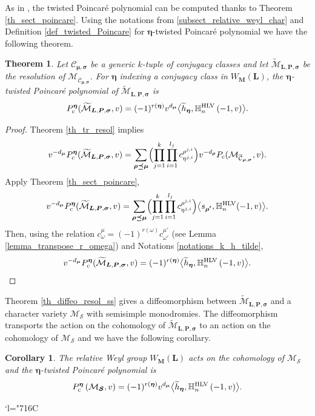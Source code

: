 \documentclass[JEP,XML,SOM,NoEqCountersInSection,Unicode,published]{cedram}
\newcommand{\Changelback}{\mathcode`l="716C}
\newcommand{\rc}{\mathrm{c}}
\newcommand{\HLV}{\textup{HLV}}
\newcommand{\blangle}{\bigl\langle}
\newcommand{\brangle}{\bigr\rangle}
\theoremstyle{definition}
\theoremstyle{plain}
\newtheorem{theorem}[definition]{Theorem}
\newtheorem{corollary}[definition]{Corollary}
\newcommand{\mcmus}{\mathcal{M}_{\overline{\mathcal{C}}_{\boldsymbol{\mu},\boldsymbol{\sigma}}}}
\newcommand{\mcmur}{\mathcal{M}_{\overline{\mathcal{C}}_{\boldsymbol{\rho},\boldsymbol{\sigma}}}}
\newcommand{\mlps}{\widetilde{\mathcal{M}}_{\boldsymbol{L},\boldsymbol{P},\boldsymbol{\sigma}}}
\begin{document}
As in \cite[Prop.\,1.9]{Letellier13}, the twisted Poincaré polynomial can be computed thanks to Theorem \ref{th_sect_poincare}. Using the notations from \ref{subsect_relative_weyl_char} and Definition \ref{def_twisted_Poincare} for $\boldsymbol{\eta}$-twisted Poincaré polynomial we have the following theorem.
\begin{theorem}\label{cor_twiste_Poincare_resol}
Let $\mathcal{C}_{\boldsymbol{\mu},\boldsymbol{\sigma}}$ be a generic $k$-tuple of conjugacy classes and let $\mlps$ be the resolution of $\mcmus$. For $\boldsymbol{\eta}$ indexing a conjugacy class in $W_{\boldsymbol{M}}(\boldsymbol{L})$, the $\boldsymbol{\eta}$-twisted Poincaré polynomial of $\mlps$ is
\[
P_{\rc}^{\boldsymbol{\eta}}(\mlps,v) = (-1)^{r(\boldsymbol{\eta})}v^{d_{\boldsymbol{\mu}}}\blangle \widetilde{h}_{\boldsymbol{\eta}},\mathbb{H}_n^{\HLV}\left(-1,v\right)\brangle.
\]
\end{theorem}
\begin{proof}
Theorem \ref{th_tr_resol} implies
\[
v^{-d_{\boldsymbol{\mu}}} P_{\rc}^{\boldsymbol{\eta}}(\mlps,v) = \sum_{\boldsymbol{\rho\preceq\mu}} \Bigl(\prod_{j=1}^k\prod_{i=1}^{l_j} c^{\rho^{j,i}}_{\eta^{j,i}}\Bigr) v^{-d_{\boldsymbol{\rho}}} P_{\rc}(\mcmur,v).
\]
Apply Theorem \ref{th_sect_poincare},
\begin{align*}
v^{-d_{\boldsymbol{\mu}}} P_{\rc}^{\boldsymbol{\eta}}(\mlps,v) = \sum_{\boldsymbol{\rho\preceq\mu}} \Bigl(\prod_{j=1}^k\prod_{i=1}^{l_j} c^{\rho^{j,i}}_{\eta^{j,i}}\Bigr)\blangle s_{\boldsymbol{\rho'}}, \mathbb{H}_n^{\HLV}(-1,v)\brangle.
\end{align*}
Then, using the relation $c_{\omega}^{\mu}=(-1)^{r(\omega)} c_{\omega'}^{\mu'}$ (see Lemma \ref{lemma_transpose_r_omega}) and Notations \ref{notations_k_h_tilde},
\[
v^{-d_{\boldsymbol{\mu}}} P_{\rc}^{\boldsymbol{\eta}}(\mlps,v) = (-1)^{r(\boldsymbol{\eta})}\blangle \widetilde{h}_{\boldsymbol{\eta}},\mathbb{H}_n^{\HLV}\left(-1,v\right)\brangle.\qedhere
\]
\end{proof}

Theorem \ref{th_diffeo_resol_ss} gives a diffeomorphism between $\mlps$ and a character variety $\mathcal{M}_{\boldsymbol{\mathcal{S}}}$ with semisimple monodromies. The diffeomorphism transports the action on the cohomology of $\mlps$ to an action on the cohomology of $\mathcal{M}_{\boldsymbol{\mathcal{S}}}$ and we have the following corollary.
\begin{corollary}
The relative Weyl group $W_{\boldsymbol{M}}(\boldsymbol{L})$ acts on the cohomology of $\mathcal{M}_{\boldsymbol{\mathcal{S}}}$ and the $\boldsymbol{\eta}$-twisted Poincaré polynomial is
\[
P_{\rc}^{\boldsymbol{\eta}}\left(\mathcal{M}_{\boldsymbol{\mathcal{S}}},v\right) = (-1)^{r(\boldsymbol{\eta})}v^{d_{\boldsymbol{\mu}}}\blangle \widetilde{h}_{\boldsymbol{\eta}},\mathbb{H}_n^{\HLV}\left(-1,v\right)\brangle.
\]
\end{corollary}

\Changelback
\backmatter


\end{document}
